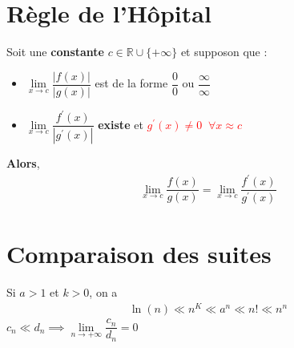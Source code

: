 \documentclass{report}
\begin{document}
\begin{multicols*}{3}
    \section{Règle de l'Hôpital}
        Soit une \textbf{constante} $c \in \mathbb{R} \cup \{+\infty\}$ et supposon que : 
        \begin{itemize}
        \item $\lim\limits_{x\to c}\dfrac{|f(x)|}{|g(x)|}$ 
            est de la forme $\dfrac{0}{0}$ ou 
            $\dfrac{\infty }{\infty }$
        \item $\lim\limits_{x\to c}\dfrac{f^{\prime}(x)}{|g^{\prime}(x)|}$
            \textbf{existe} et 
            \textcolor{red}{$g^{\prime}(x) \neq 0 \;\; \forall x \approx c$ }
        \end{itemize}
        \textbf{Alors}, 
        \begin{align*}
            \lim\limits_{x\to c}\dfrac{f(x)}{g(x)} = 
            \lim\limits_{x\to c}\dfrac{f^{\prime}(x)}{g^{\prime}(x)}
        \end{align*}
        


    






    \section{Comparaison des suites}
        Si $a > 1$ et $k > 0$, on a 
        \begin{align*}
            \ln(n) \ll n^K \ll a^n \ll n! \ll n^n
        \end{align*}
        $c_n \ll d_n \implies 
        \lim\limits_{n\to+\infty }\dfrac{c_n}{d_n} = 0$ 




















\end{multicols*}
\end{document}
